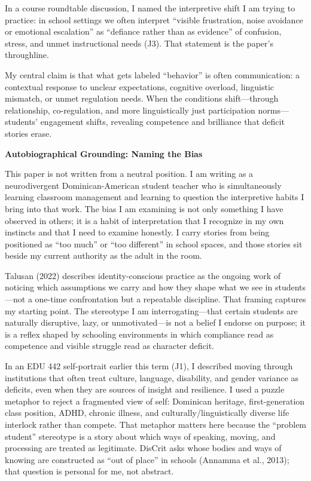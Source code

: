 \documentclass[12pt]{article}
\newcommand{\apaheading}[1]{\begin{center}\textbf{#1}\end{center}}
\newcommand{\JournalArtifact}[1]{\textsc{J#1}}
\begin{document}
In a course roundtable discussion, I named the interpretive shift I am trying to practice: in school settings we often interpret ``visible frustration, noise avoidance or emotional escalation'' as ``defiance rather than as evidence'' of confusion, stress, and unmet instructional needs (\JournalArtifact{3}). That statement is the paper's throughline.

My central claim is that what gets labeled ``behavior'' is often communication: a contextual response to unclear expectations, cognitive overload, linguistic mismatch, or unmet regulation needs. When the conditions shift---through relationship, co-regulation, and more linguistically just participation norms---students' engagement shifts, revealing competence and brilliance that deficit stories erase.

\apaheading{Autobiographical Grounding: Naming the Bias}

This paper is not written from a neutral position. I am writing as a neurodivergent Dominican-American student teacher who is simultaneously learning classroom management and learning to question the interpretive habits I bring into that work. The bias I am examining is not only something I have observed in others; it is a habit of interpretation that I recognize in my own instincts and that I need to examine honestly. I carry stories from being positioned as ``too much'' or ``too different'' in school spaces, and those stories sit beside my current authority as the adult in the room.

Talusan (2022) describes identity-conscious practice as the ongoing work of noticing which assumptions we carry and how they shape what we see in students---not a one-time confrontation but a repeatable discipline. That framing captures my starting point. The stereotype I am interrogating---that certain students are naturally disruptive, lazy, or unmotivated---is not a belief I endorse on purpose; it is a reflex shaped by schooling environments in which compliance read as competence and visible struggle read as character deficit.

In an EDU 442 self-portrait earlier this term (\JournalArtifact{1}), I described moving through institutions that often treat culture, language, disability, and gender variance as deficits, even when they are sources of insight and resilience. I used a puzzle metaphor to reject a fragmented view of self: Dominican heritage, first-generation class position, ADHD, chronic illness, and culturally/linguistically diverse life interlock rather than compete. That metaphor matters here because the ``problem student'' stereotype is a story about which ways of speaking, moving, and processing are treated as legitimate. DisCrit asks whose bodies and ways of knowing are constructed as ``out of place'' in schools (Annamma et al., 2013); that question is personal for me, not abstract.
\end{document}
